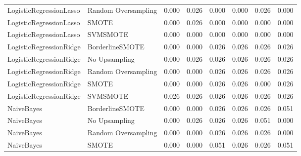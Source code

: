 \begin{tabular}{llllllll}
     LogisticRegressionLasso & Random Oversampling & 0.000 &                     0.026 &                 0.000 &                  0.000 &                                   0.026 &    0.000 \\
     LogisticRegressionLasso &               SMOTE & 0.000 &                     0.026 &                 0.000 &                  0.000 &                                   0.000 &    0.000 \\
     LogisticRegressionLasso &            SVMSMOTE & 0.000 &                     0.000 &                 0.000 &                  0.000 &                                   0.000 &    0.000 \\
     LogisticRegressionRidge &     BorderlineSMOTE & 0.000 &                     0.000 &                 0.026 &                  0.026 &                                   0.026 &    0.026 \\
     LogisticRegressionRidge &       No Upsampling & 0.000 &                     0.026 &                 0.026 &                  0.026 &                                   0.026 &    0.026 \\
     LogisticRegressionRidge & Random Oversampling & 0.000 &                     0.000 &                 0.026 &                  0.026 &                                   0.026 &    0.026 \\
     LogisticRegressionRidge &               SMOTE & 0.000 &                     0.000 &                 0.026 &                  0.026 &                                   0.000 &    0.026 \\
     LogisticRegressionRidge &            SVMSMOTE & 0.026 &                     0.026 &                 0.026 &                  0.026 &                                   0.026 &    0.026 \\
                  NaiveBayes &     BorderlineSMOTE & 0.000 &                     0.000 &                 0.026 &                  0.026 &                                   0.026 &    0.051 \\
                  NaiveBayes &       No Upsampling & 0.000 &                     0.026 &                 0.026 &                  0.026 &                                   0.051 &    0.000 \\
                  NaiveBayes & Random Oversampling & 0.000 &                     0.000 &                 0.026 &                  0.026 &                                   0.026 &    0.000 \\
                  NaiveBayes &               SMOTE & 0.000 &                     0.000 &                 0.051 &                  0.026 &                                   0.026 &    0.051 \\

\end{tabular}
